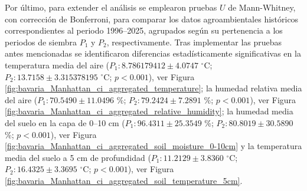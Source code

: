 Por último, para extender el análisis se emplearon pruebas $U$ de Mann-Whitney, con corrección de Bonferroni, para comparar los datos agroambientales históricos correspondientes al periodo 1996--2025, agrupados según su pertenencia a los periodos de siembra $P_1$ y $P_2$, respectivamente.  Tras implementar las pruebas antes mencionadas se identificaron diferencias estadísticamente significativas en la temperatura media del aire ($P_1:	8.786179412	\pm	4.0747	$ $^\circ$C; 	$P_2:	13.7158	\pm	3.315378195	$ $^\circ$C; 	$p<0.001$), ver Figura \ref{fig:bavaria_Manhattan_ci_aggregated_temperature}; la humedad relativa media del aire ($P_1:	70.5490	\pm	11.0496	$ \%; 	$P_2:	79.2424	\pm	7.2891	$ \%; 	$p<0.001$), ver Figura \ref{fig:bavaria_Manhattan_ci_aggregated_relative_humidity}; la humedad media del suelo en la capa de 0--10 cm ($P_1:	96.4311	\pm	25.3549	$ \%; 	$P_2:	80.8019	\pm	30.5890	$ \%; 	$p<0.001$), ver Figura \ref{fig:bavaria_Manhattan_ci_aggregated_soil_moisture_0-10cm} y la temperatura media del suelo a 5 cm de profundidad ($P_1:	11.2129	\pm	3.8360	$ $^\circ$C; 	$P_2:	16.4325	\pm	3.3695	$ $^\circ$C; 	$p<0.001$), ver Figura \ref{fig:bavaria_Manhattan_ci_aggregated_soil_temperature_5cm}.\\





